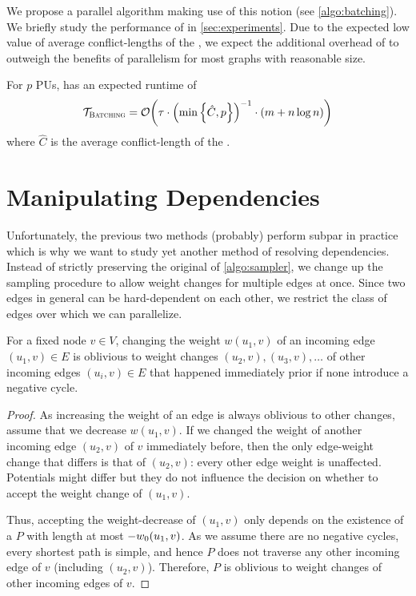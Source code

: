 We propose a parallel algorithm making use of this notion (see \cref{algo:batching}).
We briefly study the performance of \algbt in \cref{sec:experiments}.
Due to the expected low value of average conflict-lengths of the \markov, we expect the additional overhead of \algbt to outweigh the benefits of parallelism for most graphs with reasonable size.

\begin{observation}
    For $p$ PUs, \algbt has an expected runtime of \[
        \mathcal{T}_{\textsc{Batching}} = \mathcal O\!\left(\tau \cdot \left(\min\left\{\hat{C}, p\right\}\right)^{-1} \cdot (m + n\log n)\right)
    \] where $\hat{C}$ is the average conflict-length of the \markov.
\end{observation}



\section{Manipulating Dependencies}
Unfortunately, the previous two methods (probably) perform subpar in practice which is why we want to study yet another method of resolving dependencies.
Instead of strictly preserving the original \markov of \cref{algo:sampler}, we change up the sampling procedure to allow weight changes for multiple edges at once.
Since two edges in general can be hard-dependent on each other, we restrict the class of edges over which we can parallelize.

\begin{lemma}\label{lem:oblivious_neighbors}
    For a fixed node $v \in V$, changing the weight $w(u_1,v)$ of an incoming edge $(u_1,v) \in E$ is oblivious to weight changes $(u_2,v),(u_3,v),\ldots$ of other incoming edges $(u_i,v) \in E$ that happened immediately prior if none introduce a negative cycle.
\end{lemma}
\begin{proof}
    As increasing the weight of an edge is always oblivious to other changes, assume that we decrease $w(u_1,v)$.
    If we changed the weight of another incoming edge $(u_2,v)$ of $v$ immediately before, then the only edge-weight change that differs is that of $(u_2,v)$: every other edge weight is unaffected.
    Potentials might differ but they do not influence the decision on whether to accept the weight change of $(u_1,v)$.

    Thus, accepting the weight-decrease of $(u_1,v)$ only depends on the existence of a  $P$ with length at most $-\wpot(u_1,v)$.
    As we assume there are no negative cycles, every shortest path is simple, and hence $P$ does not traverse any other incoming edge of $v$ (including $(u_2,v)$).
    Therefore, $P$ is oblivious to weight changes of other incoming edges of $v$.
\end{proof}

